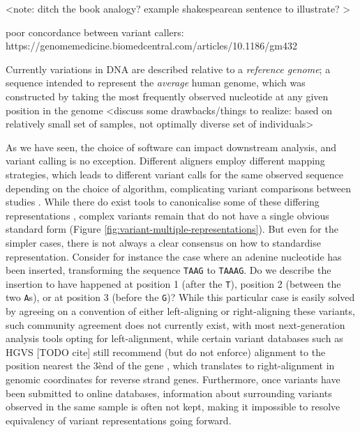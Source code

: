<note: ditch the book analogy? example shakespearean sentence to illustrate? >

poor concordance between variant callers: https://genomemedicine.biomedcentral.com/articles/10.1186/gm432


Currently variations in DNA are described relative to a \emph{reference genome}; a sequence intended to represent the \emph{average} human genome, which was constructed by taking the most frequently observed nucleotide at any given  position in the genome
<discuss some drawbacks/things to realize: based on relatively small set of samples, not optimally diverse set of individuals>

As we have seen, the choice of software can impact downstream analysis, and variant calling is no exception. Different aligners employ different mapping strategies, which leads to different variant calls for the same observed sequence depending on the choice of algorithm, complicating variant comparisons between studies \cite{zook2014integrating}. While there do exist tools to canonicalise some of these differing representations \cite{vcflib}, complex variants remain that do not have a single obvious standard form (Figure \ref{fig:variant-multiple-representations}).
But even for the simpler cases, there is not always a clear consensus on how to standardise representation. Consider for instance the case where an adenine nucleotide has been inserted, transforming the sequence \verb+TAAG+ to \verb+TAAAG+. Do we describe the insertion to have happened at position 1 (after the \verb+T+), position 2 (between the two \verb+A+s), or at position 3 (before the \verb+G+)? While this particular case is easily solved by agreeing on a convention of either left-aligning or right-aligning these variants, such community agreement does not currently exist, with most next-generation analysis tools opting for left-alignment, while certain variant databases such as HGVS [TODO cite] still recommend (but do not enforce) alignment to the position nearest the 3\` end of the gene \cite{hgvs-position}, which translates to right-alignment in genomic coordinates for reverse strand genes. Furthermore, once variants have been submitted to online databases, information about surrounding variants observed in the same sample is often not kept, making it impossible to resolve equivalency of variant representations going forward.


